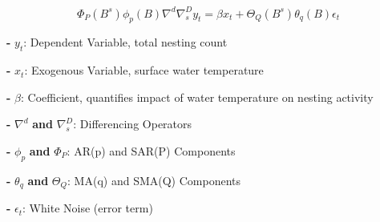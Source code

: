 \documentclass[
  letterpaper,
  DIV=11,
  numbers=noendperiod]{scrartcl}
\begin{document}
\[ 
    \Phi_P(B^s)\phi_p(B)\nabla^d\nabla_s^Dy_t=\beta x_t+\Theta_Q (B^s)\theta_q(B)\epsilon_t
\]

\textbf{-} \(y_t\): Dependent Variable, total nesting count

\textbf{-} \(x_t\): Exogenous Variable, surface water temperature

\textbf{-} \(\beta\): Coefficient, quantifies impact of water
temperature on nesting activity

\textbf{-} \(\nabla^d\) \textbf{and} \(\nabla_s^D\): Differencing
Operators

\textbf{-} \(\phi_p\) \textbf{and} \(\Phi_P\): AR(p) and SAR(P)
Components

\textbf{-} \(\theta_q\) \textbf{and} \(\Theta_Q\): MA(q) and SMA(Q)
Components

\textbf{-} \(\epsilon_t\): White Noise (error term)
\end{document}
